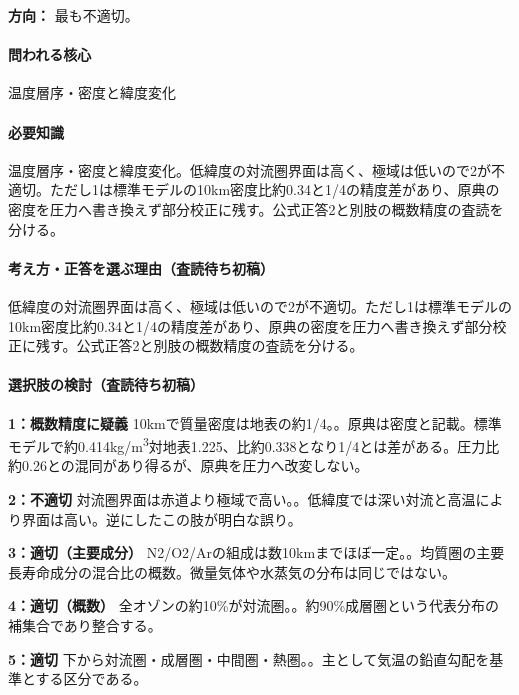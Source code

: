 \noindent\textbf{方向：} 最も不適切。\par

\paragraph{問われる核心} 温度層序・密度と緯度変化

\paragraph{必要知識} 温度層序・密度と緯度変化。低緯度の対流圏界面は高く、極域は低いので2が不適切。ただし1は標準モデルの10km密度比約0.34と1/4の精度差があり、原典の密度を圧力へ書き換えず部分校正に残す。公式正答2と別肢の概数精度の査読を分ける。

\paragraph{考え方・正答を選ぶ理由（査読待ち初稿）} 低緯度の対流圏界面は高く、極域は低いので2が不適切。ただし1は標準モデルの10km密度比約0.34と1/4の精度差があり、原典の密度を圧力へ書き換えず部分校正に残す。公式正答2と別肢の概数精度の査読を分ける。

\paragraph{選択肢の検討（査読待ち初稿）}\mbox{}\par

\noindent\textbf{1：概数精度に疑義} 10kmで質量密度は地表の約1/4。。原典は密度と記載。標準モデルで約0.414kg/m\textsuperscript{3}対地表1.225、比約0.338となり1/4とは差がある。圧力比約0.26との混同があり得るが、原典を圧力へ改変しない。\par

\noindent\textbf{2：不適切} 対流圏界面は赤道より極域で高い。。低緯度では深い対流と高温により界面は高い。逆にしたこの肢が明白な誤り。\par

\noindent\textbf{3：適切（主要成分）} N2/O2/Arの組成は数10kmまでほぼ一定。。均質圏の主要長寿命成分の混合比の概数。微量気体や水蒸気の分布は同じではない。\par

\noindent\textbf{4：適切（概数）} 全オゾンの約10\%が対流圏。。約90\%成層圏という代表分布の補集合であり整合する。\par

\noindent\textbf{5：適切} 下から対流圏・成層圏・中間圏・熱圏。。主として気温の鉛直勾配を基準とする区分である。\par

